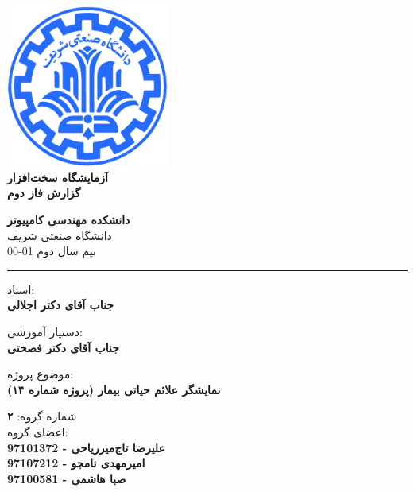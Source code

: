 \documentclass[12pt]{article}
\begin{document}
\begin{titlepage}
\begin{center}
        
\vspace*{0.7cm}

\includegraphics[width=0.4\textwidth]{sharif1.png}\\
\vspace{0.5cm}
\textbf{ \Huge{\emph ‌آزمایشگاه سخت‌افزار} }\\
\vspace{0.5cm}
\textbf{ \Large{گزارش فاز دوم} }
\vspace{0.2cm}
       
 
      \large \textbf{دانشکده مهندسی کامپیوتر}\\\vspace{0.2cm}
    \large   دانشگاه صنعتی شریف\\\vspace{0.2cm}
       \large   ﻧﯿﻢ سال دوم 01-00 \\\vspace{0.2cm}
      \noindent\rule[1ex]{\linewidth}{1pt}
استاد:\\
    \textbf{{جناب آقای دکتر اجلالی}}


دستیار آموزشی:\\
\textbf{{جناب آقای دکتر فصحتی}}

    \vspace{0.25cm}
    
    موضوع پروژه:\\
    
    \textbf{{نمایشگر علائم حیاتی بیمار (پروژه شماره ۱۴)}}
    
    \vspace{0.35cm}
    
    
        شماره گروه:
    \textbf{{۲}}\\
    
اعضای گروه:\\

    \textbf{{علیرضا تاج‌میرریاحی - 97101372}}
    \\
   
     \textbf{{امیرمهدی نامجو - 97107212}}   
   \\
   
    \textbf{{ صبا هاشمی - 97100581}}
\end{center}
\end{titlepage}
\end{document}
